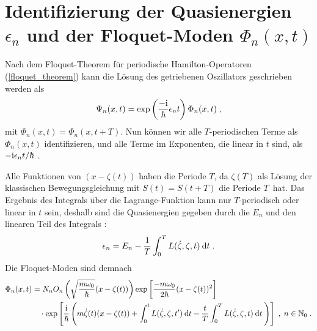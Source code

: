       \section{\texorpdfstring{Identifizierung der Quasienergien $\epsilon_n$ und der Floquet-Moden $\Phi_n(x,t)$}{Identifizierung der Quasienergien epsilon_n und der Floquet-Moden Phi_n(x,t)}}
        Nach dem Floquet-Theorem für periodische Hamilton-Operatoren (\ref{floquet_theorem}) kann die Lösung des getriebenen Oszillators geschrieben werden als
        \begin{equation}
          \Psi_n(x,t) = \exp\left(\frac{-\text i}{\hbar}\epsilon_nt\right)\Phi_n(x,t) \; ,
        \end{equation}
        mit $\Phi_n(x,t)=\Phi_n(x,t+T)$.
        Nun können wir alle $T$-periodischen Terme als $\Phi_n(x,t)$ identifizieren, und alle Terme im Exponenten, die linear in $t$ sind, als $-\text i\epsilon_n t/\hbar$ \cite{haengi}.

        Alle Funktionen von $(x-\zeta(t))$ haben die Periode $T$, da $\zeta(T)$ als Lösung der klassischen Bewegungsgleichung mit $S(t)=S(t+T)$ die Periode $T$ \,hat. Das
        Ergebnis des Integrals über die Lagrange-Funktion kann nur $T$-periodisch oder linear in $t$ sein, deshalb sind die Quasienergien gegeben durch die $E_n$ und den linearen Teil des Integrals \cite{haengi}:
        \begin{equation}
          \epsilon_n = E_n - \frac{1}{T} \int_0^T L(\dot \zeta, \zeta, t) \: \text d t \; .
          \label{ep}
        \end{equation}
        Die Floquet-Moden sind demnach
        \begin{align}
          \begin{split}
            \Phi_n(x,t) &=
             N_nO_n\left(\sqrt{\frac{m\omega_0}{\hbar}}(x-\zeta(t))\right) \exp\left[\frac{-m\omega_0}{2\hbar}(x-\zeta(t))^2\right] \\
            &\quad \cdot \exp\left[\frac{\text i}{\hbar}\left(m\dot \zeta(t)(x-\zeta(t))+\int_0^tL(\dot \zeta,\zeta,t')\:\text d t-\frac{t}{T} \int_0^T L(\dot \zeta,\zeta,t)\:\text dt\: \right)\right] \; ,
            \;n \in \mathbb{N}_0 \; .
            \label{floquet_moden_einzelner}
          \end{split}
        \end{align}


